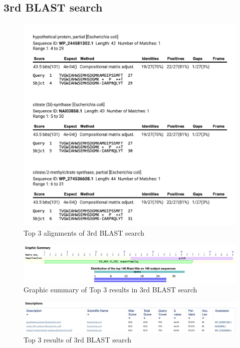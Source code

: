 \documentclass[a4paper,english,12pt,bibliography=totoc]{scrreprt}
\begin{document}
\subsection{3rd BLAST search}

\begin{figure}[H]
    \centering
    \includegraphics[width=0.9\linewidth]{Project 1/3rd images/alignments 3.png}
    \caption{Top 3 alignments of 3rd BLAST search}
    \label{fig:enter-label}
\end{figure}

\begin{figure}[H]
    \centering
    \includegraphics[width=0.9\linewidth]{Project 1/3rd images/graphic summary 3.png}
    \caption{Graphic summary of Top 3 results in 3rd BLAST search}
    \label{fig:enter-label}
\end{figure}


\begin{figure}[H]
    \centering
    \includegraphics[width=0.9\linewidth]{Project 1/3rd images/Blast results 3.png}
    \caption{Top 3 results of 3rd BLAST search}
    \label{fig:enter-label}
\end{figure}
\end{document}

